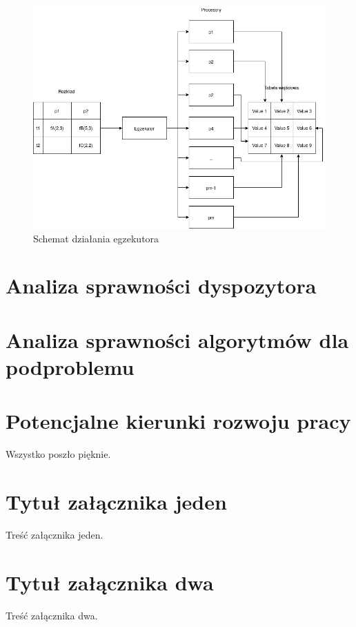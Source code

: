\documentclass[brudnopis]{xmgr}
\begin{document}
\begin{figure}[!tbh]
\centering
\includegraphics[width=.8\hsize]{fig/executor.png}
\caption{Schemat działania egzekutora\label{diag:executor}}
\end{figure}



\chapter{Analiza sprawności dyspozytora}


\chapter{Analiza sprawności algorytmów dla podproblemu}


\chapter{Potencjalne kierunki rozwoju pracy} \label{chap:extend}


\summary

Wszystko poszło pięknie.

\appendix
\chapter{Tytuł załącznika jeden}

Treść załącznika jeden.

\chapter{Tytuł załącznika dwa}

Treść załącznika dwa.




\listoftables

\listoffigures

\oswiadczenie
\end{document}
